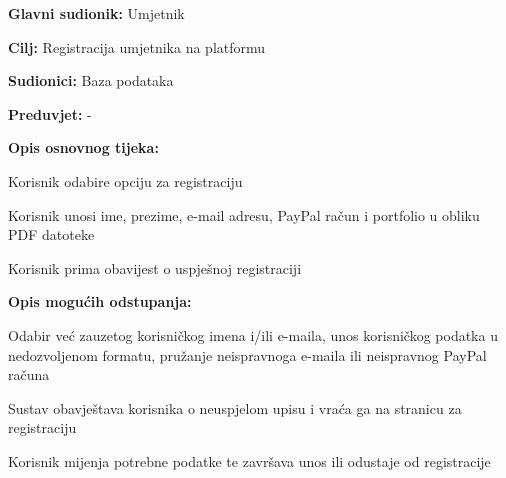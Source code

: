 					\noindent {}
					\begin{packed_item}
						
						\item \textbf{Glavni sudionik: } Umjetnik
						\item  \textbf{Cilj:}  Registracija umjetnika na platformu
						\item  \textbf{Sudionici:}  Baza podataka
						\item  \textbf{Preduvjet:}  -
						\item  \textbf{Opis osnovnog tijeka:}
						
						\item[] \begin{packed_enum}
							
							\item  Korisnik odabire opciju za registraciju
							\item  Korisnik unosi ime, prezime, e-mail adresu, PayPal račun i 
							portfolio u obliku PDF datoteke
							\item  Korisnik prima obavijest o uspješnoj registraciji
						\end{packed_enum}
						
						\item  \textbf{Opis mogućih odstupanja:}
						
						\item[] \begin{packed_item}
							
							\item[2.a]  Odabir već zauzetog korisničkog imena i/ili e-maila, unos korisničkog 
							podatka u nedozvoljenom formatu, pružanje neispravnoga e-maila ili neispravnog PayPal računa
							\item[] \begin{packed_enum}
								
								\item  Sustav obavještava korisnika o neuspjelom upisu i 
								vraća ga na stranicu za registraciju
								\item  Korisnik mijenja potrebne podatke te završava unos ili 
								odustaje od registracije
								
							\end{packed_enum}
							
						\end{packed_item}
					\end{packed_item}
						
